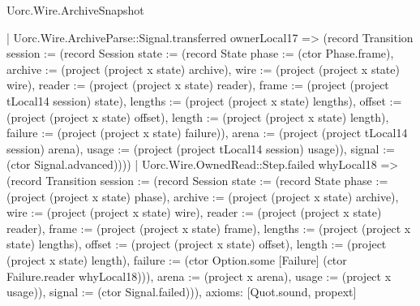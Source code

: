 \begin{lexlean}{Uorc.Wire.ArchiveSnapshot}
\begin{semanticmodule}
{      | Uorc.Wire.ArchiveParse::Signal.transferred ownerLocal17 => (record Transition {session := (record Session {state := (record State {phase := (ctor Phase.frame), archive := (project (project x state) archive), wire := (project (project x state) wire), reader := (project (project x state) reader), frame := (project (project tLocal14 session) state), lengths := (project (project x state) lengths), offset := (project (project x state) offset), length := (project (project x state) length), failure := (project (project x state) failure)}), arena := (project (project tLocal14 session) arena), usage := (project (project tLocal14 session) usage)}), signal := (ctor Signal.advanced)})))
    | Uorc.Wire.OwnedRead::Step.failed whyLocal18 => (record Transition {session := (record Session {state := (record State {phase := (project (project x state) phase), archive := (project (project x state) archive), wire := (project (project x state) wire), reader := (project (project x state) reader), frame := (project (project x state) frame), lengths := (project (project x state) lengths), offset := (project (project x state) offset), length := (project (project x state) length), failure := (ctor Option.some [Failure] (ctor Failure.reader whyLocal18))}), arena := (project x arena), usage := (project x usage)}), signal := (ctor Signal.failed)})),
  axioms: [Quot.sound, propext]
}


\end{semanticmodule}
\end{lexlean}
